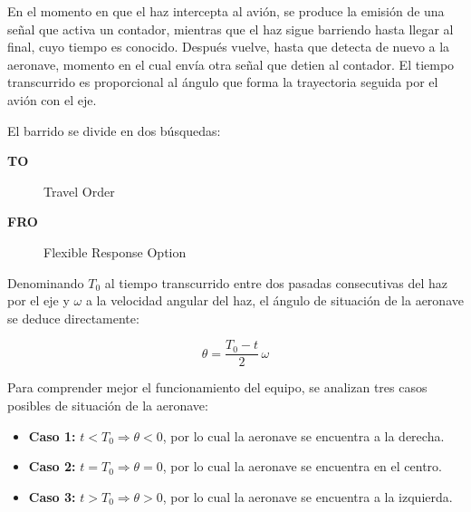 En el momento en que el haz intercepta al avión, se produce la emisión de una señal que activa un
contador, mientras que el haz sigue barriendo hasta llegar al final, cuyo tiempo es conocido. Después
vuelve, hasta que detecta de nuevo a la aeronave, momento en el cual envía otra señal que detien al
contador. El tiempo transcurrido es proporcional al ángulo que forma la trayectoria seguida por el
avión con el eje.

El barrido se divide en dos búsquedas:

\begin{description}
     \item[\bf TO]  Travel Order
     \item[\bf FRO] Flexible Response Option
\end{description}

Denominando $T_0$ al tiempo transcurrido entre dos pasadas consecutivas del haz por el eje y $\omega$ a
la velocidad angular del haz, el ángulo de situación de la aeronave se deduce directamente:

\[ \displaystyle \theta = \frac{T_0 - t}{2}\,\omega
  \]

Para comprender mejor el funcionamiento del equipo, se analizan tres casos posibles de situación
de la aeronave:


\begin{itemize}
\item \textbf{Caso 1:} $t < T_0\Longrightarrow \theta < 0$, por lo cual la aeronave se encuentra a
  la derecha.  
\item \textbf{Caso 2:} $ t = T_0 \Longrightarrow \theta = 0$, por lo cual la aeronave se
  encuentra en el centro.


\item \textbf{Caso 3:} $ t > T_0 \Longrightarrow \theta > 0$, por lo cual la aeronave se encuentra a la izquierda.
\end{itemize}


